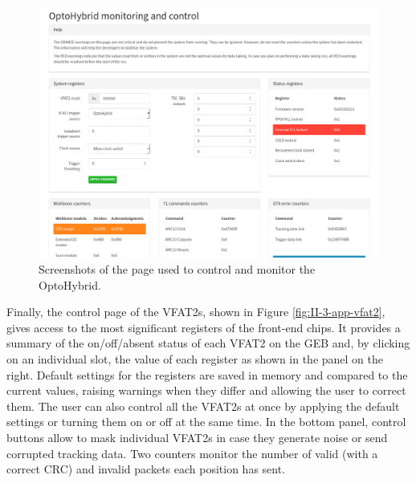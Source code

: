       \begin{figure}[h!]
        \centering
        \includegraphics[width=\textwidth]{img/II-3-test-beam/app-oh.png}
        \caption{Screenshots of the page used to control and monitor the OptoHybrid.}
        \label{fig:II-3-app-oh}
      \end{figure}

      Finally, the control page of the VFAT2s, shown in Figure \ref{fig:II-3-app-vfat2}, gives access to the most significant registers of the front-end chips. It provides a summary of the on/off/absent status of each VFAT2 on the GEB and, by clicking on an individual slot, the value of each register as shown in the panel on the right. Default settings for the registers are saved in memory and compared to the current values, raising warnings when they differ and allowing the user to correct them. The user can also control all the VFAT2s at once by applying the default settings or turning them on or off at the same time. In the bottom panel, control buttons allow to mask individual VFAT2s in case they generate noise or send corrupted tracking data. Two counters monitor the number of valid (with a correct CRC) and invalid packets each position has sent.

